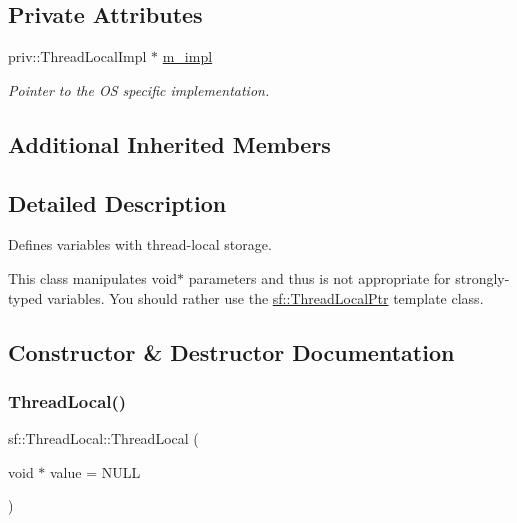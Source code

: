 \subsection*{Private Attributes}
\begin{DoxyCompactItemize}
\item 
\mbox{\label{classsf_1_1_thread_local_ad736c197dd72c45ee48c57fa3704c00a}} 
priv\+::\+Thread\+Local\+Impl $\ast$ \mbox{\hyperlink{classsf_1_1_thread_local_ad736c197dd72c45ee48c57fa3704c00a}{m\+\_\+impl}}
\begin{DoxyCompactList}\small\item\em Pointer to the OS specific implementation. \end{DoxyCompactList}\end{DoxyCompactItemize}
\subsection*{Additional Inherited Members}


\subsection{Detailed Description}
Defines variables with thread-\/local storage. 

\begin{DoxyVerb}\end{DoxyVerb}


This class manipulates void$\ast$ parameters and thus is not appropriate for strongly-\/typed variables. You should rather use the \mbox{\hyperlink{classsf_1_1_thread_local_ptr}{sf\+::\+Thread\+Local\+Ptr}} template class. \begin{DoxyVerb}\end{DoxyVerb}
 

\subsection{Constructor \& Destructor Documentation}
\mbox{\label{classsf_1_1_thread_local_a44ea3c4be4eef118080275cbf4cf04cd}} 
\subsubsection{\texorpdfstring{ThreadLocal()}{ThreadLocal()}}
{\footnotesize\ttfamily sf\+::\+Thread\+Local\+::\+Thread\+Local (\begin{DoxyParamCaption}\item[{void $\ast$}]{value = {\ttfamily NULL} }\end{DoxyParamCaption})}



